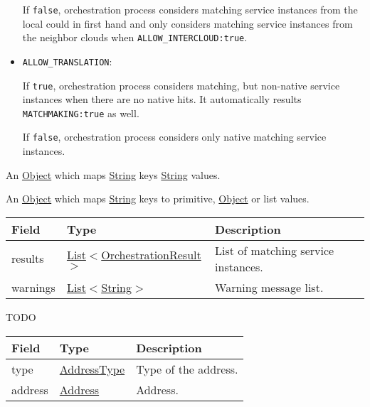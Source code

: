 \documentclass[a4paper]{arrowhead}
\newcommand{\pref}[1]{{\textcolor{ArrowheadGrey}{\hyperref[sec:model:primitives:#1]{#1}}}}
\begin{document}
\begin{itemize}
    If \texttt{false}, orchestration process considers matching service instances from the local could in first hand and only considers matching service instances from the neighbor clouds when \texttt{ALLOW\_INTERCLOUD:true}.
    
    \item \texttt{ALLOW\_TRANSLATION}:

    If \texttt{true}, orchestration process considers matching, but non-native service instances when there are no native hits. It automatically results \texttt{MATCHMAKING:true} as well.

     If \texttt{false}, orchestration process considers only native matching service instances.
    
\end{itemize}


An \pref{Object} which maps \pref{String} keys \pref{String} values.


An \pref{Object} which maps \pref{String} keys to primitive, \pref{Object} or list values.

 
\begin{table}[ht!]
\begin{tabularx}{\textwidth}{| p{3cm} | p{4.25cm} | X |} \hline
\rowcolor{gray!33} Field & Type & Description \\ \hline
results & \pref{List}$<$\hyperref[sec:model:OrchestrationResult]{OrchestrationResult}$>$ & List of matching service instances. \\ \hline
warnings & \pref{List}$<$\hyperref[sec:model:String]{String}$>$ & Warning message list. \\ \hline
\end{tabularx}
\end{table}


TODO


\begin{table}[ht!]
\begin{tabularx}{\textwidth}{| p{4.25cm} | p{3.5cm} | X |} \hline
\rowcolor{gray!33} Field & Type      & Description \\ \hline
type & \pref{AddressType} & Type of the address. \\ \hline
address & \pref{Address} & Address. \\ \hline
\end{tabularx}
\end{table}
\end{document}
